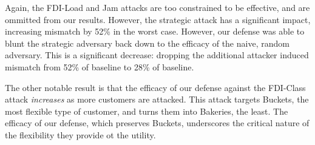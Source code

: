 Again, the FDI-Load and Jam attacks are too constrained to be effective, and are ommitted from our results.  However, the strategic attack has a significant impact, increasing mismatch by 52\% in the worst case.  However, our defense was able to blunt the strategic adversary back down to the efficacy of the naive, random adversary.  This is a significant decrease: dropping the additional attacker induced mismatch from 52\% of baseline to 28\% of baseline. 

The other notable result is that the efficacy of our defense against the FDI-Class attack \emph{increases} as more customers are attacked.  This attack targets Buckets, the most flexible type of customer, and turns them into Bakeries, the least.  The efficacy of our defense, which preserves Buckets, underscores the critical nature of the flexibility they provide ot the utility.  